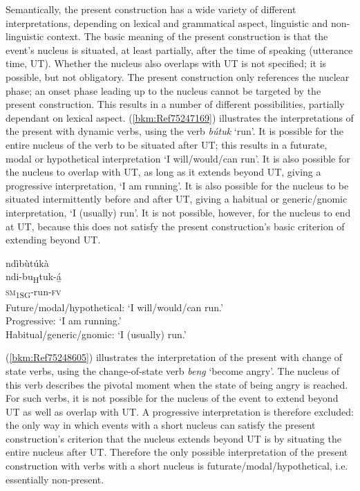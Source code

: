 Semantically, the present construction has a wide variety of different interpretations, depending on lexical and grammatical aspect, linguistic and non-lin\-guis\-tic context. The basic meaning of the present construction is that the event’s nucleus is situated, at least partially, after the time of speaking (utterance time, UT). Whether the nucleus also overlaps with UT is not specified; it is possible, but not obligatory. The present construction only references the nuclear phase; an onset phase leading up to the nucleus cannot be targeted by the present construction. This results in a number of different possibilities, partially dependant on lexical aspect. (\ref{bkm:Ref75247169}) illustrates the interpretations of the present with dynamic verbs, using the verb \textit{bútuk} ‘run’. It is possible for the entire nucleus of the verb to be situated after UT; this results in a futurate, modal or hypothetical interpretation ‘I will/would/can run’. It is also possible for the nucleus to overlap with UT, as long as it extends beyond UT, giving a progressive interpretation, ‘I am running’. It is also possible for the nucleus to be situated intermittently before and after UT, giving a habitual or generic/gnomic interpretation, ‘I (usually) run’. It is not possible, however, for the nucleus to end at UT, because this does not satisfy the present construction’s basic criterion of extending beyond UT.

\ea
\label{bkm:Ref75247169}
ndìbùtúkà\\
ndi-bu\textsubscript{H}tuk-á̲\\
\textsc{sm}\textsubscript{1SG}-run-\textsc{fv}\\
Future/modal/hypothetical: ‘I will/would/can run.’\\
Progressive: ‘I am running.’\\
Habitual/generic/gnomic: ‘I (usually) run.’
\z

(\ref{bkm:Ref75248605}) illustrates the interpretation of the present with change of state verbs, using the change-of-state verb \textit{beng} ‘become angry’. The nucleus of this verb describes the pivotal moment when the state of being angry is reached. For such verbs, it is not possible for the nucleus of the event to extend beyond UT as well as overlap with UT. A progressive interpretation is therefore excluded: the only way in which events with a short nucleus can satisfy the present construction’s criterion that the nucleus extends beyond UT is by situating the entire nucleus after UT. Therefore the only possible interpretation of the present construction with verbs with a short nucleus is futurate/modal/hypothetical, i.e. essentially non-present.

